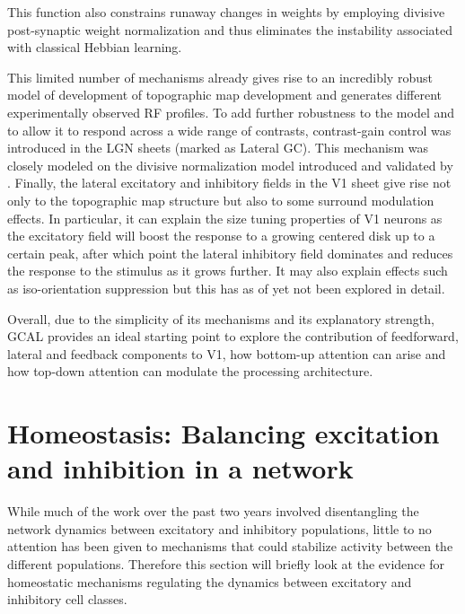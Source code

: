 This function also constrains runaway changes in weights by employing
divisive post-synaptic weight normalization and thus eliminates the
instability associated with classical Hebbian learning.

This limited number of mechanisms already gives rise to an incredibly
robust model of development of topographic map development and
generates different experimentally observed RF profiles. To add
further robustness to the model and to allow it to respond across a
wide range of contrasts, contrast-gain control was introduced in the
LGN sheets (marked as Lateral GC). This mechanism was closely modeled
on the divisive normalization model introduced and validated by
\cite{Bonin2005}. Finally, the lateral excitatory and inhibitory
fields in the V1 sheet give rise not only to the topographic map
structure but also to some surround modulation effects. In particular,
it can explain the size tuning properties of V1 neurons as the
excitatory field will boost the response to a growing centered disk up
to a certain peak, after which point the lateral inhibitory field
dominates and reduces the response to the stimulus as it grows
further. It may also explain effects such as iso-orientation
suppression but this has as of yet not been explored in detail.

Overall, due to the simplicity of its mechanisms and its explanatory
strength, GCAL provides an ideal starting point to explore the
contribution of feedforward, lateral and feedback components to V1,
how bottom-up attention can arise and how top-down attention can
modulate the processing architecture.



\section{Homeostasis: Balancing excitation and inhibition in a network}

While much of the work over the past two years involved disentangling
the network dynamics between excitatory and inhibitory populations,
little to no attention has been given to mechanisms that could
stabilize activity between the different populations. Therefore this
section will briefly look at the evidence for homeostatic mechanisms
regulating the dynamics between excitatory and inhibitory cell
classes.

